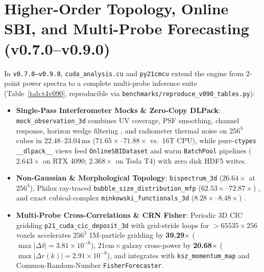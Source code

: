 \documentclass[11pt,twocolumn]{article}
\begin{document}
\section{Higher-Order Topology, Online SBI, and Multi-Probe Forecasting (v0.7.0--v0.9.0)}
In \texttt{v0.7.0--v0.9.0}, \texttt{cuda\_analysis.cu} and \texttt{py21cmcu} extend the engine from 2-point power spectra to a complete multi-probe inference suite (Table~\ref{tab:t4v090}, reproducible via \texttt{benchmarks/reproduce\_v090\_tables.py}):
\begin{itemize}
  \item \textbf{Single-Pass Interferometer Mocks \& Zero-Copy DLPack}: \texttt{mock\_observation\_3d} combines UV coverage, PSF smoothing, channel response, horizon wedge filtering \cite{Parsons2012}, and radiometer thermal noise on $256^3$ cubes in $22.48\text{--}23.04$\,ms ($71.65\times\text{--}71.88\times$ vs.\ 16T CPU), while pure-\texttt{ctypes} \texttt{\_\_dlpack\_\_} views feed \texttt{OnlineSBIDataset} and warm \texttt{BatchPool} pipelines ($2.643\times$ on RTX 4090; $2.368\times$ on Tesla T4) with zero disk HDF5 writes.
  \item \textbf{Non-Gaussian \& Morphological Topology}: \texttt{bispectrum\_3d} ($26.64\times$ at $256^3$), Philox ray-traced \texttt{bubble\_size\_distribution\_mfp} ($62.53\times\text{--}72.87\times$) \cite{Mesinger2007}, and exact cubical-complex \texttt{minkowski\_functionals\_3d} ($8.28\times\text{--}8.48\times$) \cite{Schmalzing1997}.
  \item \textbf{Multi-Probe Cross-Correlations \& CRN Fisher}: Periodic 3D CIC gridding \texttt{p21\_cuda\_cic\_deposit\_3d} \cite{Hockney1988} with grid-stride loops for $>65535\times 256$ voxels accelerates $256^3$ 1M-particle gridding by \textbf{39.29$\times$} ($\max|\Delta\delta|=3.81\times 10^{-6}$), $21\text{cm} \times \text{galaxy}$ cross-power by \textbf{20.68$\times$} ($\max|\Delta r(k)|=2.91\times 10^{-8}$), and integrates with \texttt{ksz\_momentum\_map} \cite{Sunyaev1980} and Common-Random-Number \texttt{FisherForecaster}.
\end{itemize}

\begin{table}[t]
\centering
\scriptsize

\caption{Verified \texttt{v0.9.0} higher-order topology, warm \texttt{BatchPool}, and multi-probe CIC / cross-power benchmarks on Google Colab Tesla T4 (\texttt{benchmarks/results\_t4\_v090.json}).}
\label{tab:t4v090}
\end{table}



\end{document}
